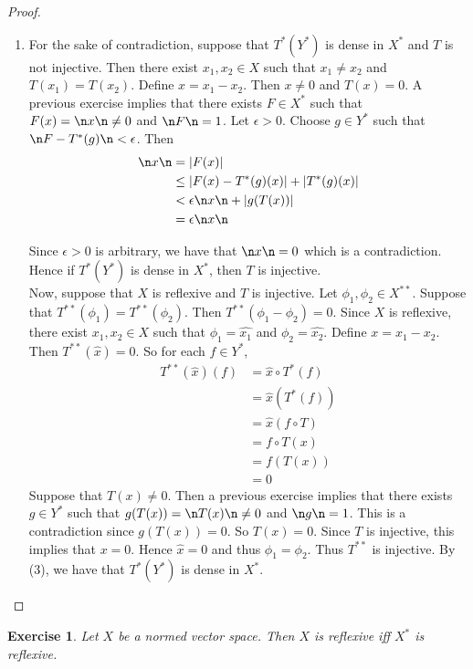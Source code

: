 \documentclass[12pt]{amsart}
\newtheorem{ex}[thm]{Exercise}
\newcommand{\ep}{\epsilon}
\begin{document}
\begin{proof}
\begin{enumerate}
		\item For the sake of contradiction, suppose that $T^*(Y^*)$ is dense in $X^*$ and $T$ is not injective. Then there exist $x_1, x_2 \in X$ such that $x_1 \neq x_2$ and $T(x_1) = T(x_2)$. Define $x = x_1-x_2$. Then $x \neq 0$ and $T(x) = 0$. A previous exercise implies that there exists $F \in X^*$ such that $F(x) = \n x\n \neq 0$ and $\n F \n = 1$. Let $\ep >0$. Choose $g \in Y^*$ such that $\n F - T^*(g) \n < \ep$. Then 
		\begin{align*}
			\n x \n 
			&= \vert F(x) \vert \\
			&\leq \vert F(x) - T^*(g)(x) \vert + \vert T^*(g)(x) \vert \\
			& < \ep \n x \n + \vert g(T(x)) \vert\\
			&= \ep \n x \n
		\end{align*}
		
		Since $\ep > 0$ is arbitrary, we have that $\n x \n =0$ which is a contradiction. Hence if $T^*(Y^*) $ is dense in $X^*$, then $T$ is injective. \vspace{.5cm}\\ 
		Now, suppose that $X$ is reflexive and $T$ is injective. Let $\phi_1, \phi_2 \in X^{**}$. Suppose that $T^{**}(\phi_1) = T^{**}(\phi_2)$. Then $T^{**}(\phi_1 - \phi_2) = 0$. Since $X$ is reflexive, there exist $x_1, x_2 \in X$ such that $\phi_1 = \hat{x_1}$ and $\phi_2 = \hat{x_2}$. Define $x = x_1 - x_2$. Then $T^{**}(\hat{x}) = 0$. So for each $f \in Y^*$, 
		\begin{align*}
			T^{**}(\hat{x})(f) 
			&= \hat{x} \circ T^*(f)\\
			&= \hat{x}( T^*(f))\\
			&= \hat{x} (f \circ T)\\
			&= f \circ T(x)\\
			&= f(T(x))\\
			&= 0 
		\end{align*}
		Suppose that $T(x) \neq 0$. Then a previous exercise implies that there exists $g \in Y^*$ such that $g(T(x)) = \n T(x) \n \neq 0$ and $\n g \n  = 1$. This is a contradiction since $g(T(x)) = 0$. So $T(x) = 0$. Since $T$ is injective, this implies that $x = 0$. Hence $\hat{x}=0$ and thus $\phi_1 = \phi_2$. Thus $T^{**}$ is injective. By (3), we have that $T^*(Y^*)$ is dense in $X^*$.
	\end{enumerate}
\end{proof}

\begin{ex}
	Let $X$ be a normed vector space. Then $X$ is reflexive iff $X^*$ is reflexive. 
\end{ex}
\end{document}
